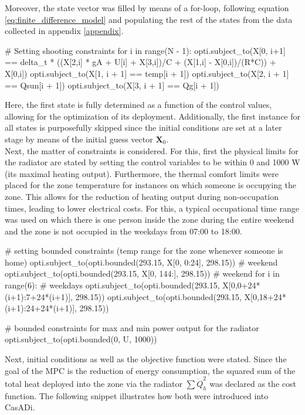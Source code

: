Moreover, the state vector was filled by means of a for-loop, following equation \ref{eq:finite_difference_model} and populating the rest of the states from the data collected in appendix \ref{appendix}.
\begin{python}
# Setting shooting constraints
for i in range(N - 1):
    opti.subject_to(X[0, i+1] == delta_t * ((X[2,i] * gA + U[i] + X[3,i])/C + (X[1,i] - X[0,i])/(R*C)) + X[0,i])
    opti.subject_to(X[1, i + 1] == temp[i + 1])
    opti.subject_to(X[2, i + 1] == Qsun[i + 1])
    opti.subject_to(X[3, i + 1] == Qg[i + 1])
\end{python}

Here, the first state is fully determined as a function of the control values, allowing for the optimization of its deployment. Additionally, the first instance for all states is purposefully skipped since the initial conditions are set at a later stage by means of the initial guess vector $\boldsymbol{X}_0$.\\

Next, the matter of constraints is considered. For this, first the physical limits for the radiator are stated by setting the control variables to be within 0 and 1000 W (its maximal heating output). Furthermore, the thermal comfort limits were placed for the zone temperature for instances on which someone is occupying the zone. This allows for the reduction of heating output during non-occupation times, leading to lower electrical costs. For this, a typical occupational time range was used on which there is one person inside the zone during the entire weekend and the zone is not occupied in the weekdays from 07:00 to 18:00.

\begin{python}
# setting bounded constraints (temp range for the zone whenever someone is home)
opti.subject_to(opti.bounded(293.15, X[0, 0:24], 298.15))  # weekend
opti.subject_to(opti.bounded(293.15, X[0, 144:], 298.15))  # weekend
for i in range(6):  # weekdays
   opti.subject_to(opti.bounded(293.15, X[0,0+24*(i+1):7+24*(i+1)], 298.15))
   opti.subject_to(opti.bounded(293.15, X[0,18+24*(i+1):24+24*(i+1)], 298.15))

# bounded constraints for max and min power output for the radiator
opti.subject_to(opti.bounded(0, U, 1000))
\end{python}

Next, initial conditions as well as the objective function were stated. Since the goal of the MPC is the reduction of energy consumption, the squared sum of the total heat deployed into the zone via the radiator $\sum \dot{Q}_{h}^2$ was declared as the cost function. The following snippet illustrates how both were introduced into CasADi.

